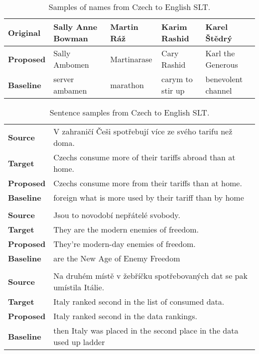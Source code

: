 \begin{table}[]
	\centering
	\small
	\begin{tabular}{l|llll}
		\textbf{Original} & Sally Anne Bowman & Martin Ráž  & Karim Rashid     & Karel Štědrý       \\ \hline
		\textbf{Proposed} & Sally Ambomen     & Martinarase & Cary Rashid      & Karl the Generous  \\
		\textbf{Baseline} & server ambamen    & marathon    & carym to stir up & benevolent channel
	\end{tabular}
	\caption{Samples of names from Czech to English SLT.}
	\label{tab:cs_en_names}
\end{table}

\begin{table}[]
	\centering
	\begin{tabular}{ll}
		\multicolumn{1}{l|}{\textbf{Source}}   & V zahraničí Češi spotřebují více ze svého tarifu než doma.      \\
		\multicolumn{1}{l|}{\textbf{Target}}   & Czechs consume more of their tariffs abroad than at home. \\
		\multicolumn{1}{l|}{\textbf{Proposed}} & Czechs consume more from their tariffs than at home.      \\
		\multicolumn{1}{l|}{\textbf{Baseline}} & foreign what is more used by their tariff than by home    \\
		\textbf{}                              &                                                           \\
		\multicolumn{1}{l|}{\textbf{Source}}   & Jsou to novodobí nepřátelé svobody.      \\
		\multicolumn{1}{l|}{\textbf{Target}}   & They are the modern enemies of freedom.      \\
		\multicolumn{1}{l|}{\textbf{Proposed}} & They're modern-day enemies of freedom.                 \\
		\multicolumn{1}{l|}{\textbf{Baseline}} & are the New Age of Enemy Freedom      \\
		\textbf{}                              &                                                           \\
		\multicolumn{1}{l|}{\textbf{Source}}   & Na druhém místě v žebříčku spotřebovaných dat se pak umístila Itálie.      \\
		\multicolumn{1}{l|}{\textbf{Target}}   & Italy ranked second in the list of consumed data. \\
		\multicolumn{1}{l|}{\textbf{Proposed}} & Italy ranked second in the data rankings.      \\
		\multicolumn{1}{l|}{\textbf{Baseline}} & then Italy was placed in the second place in the data used up ladder   
	\end{tabular}
	\caption{Sentence samples from Czech to English SLT.}
	\label{tab:cs_en_sample}
\end{table}


